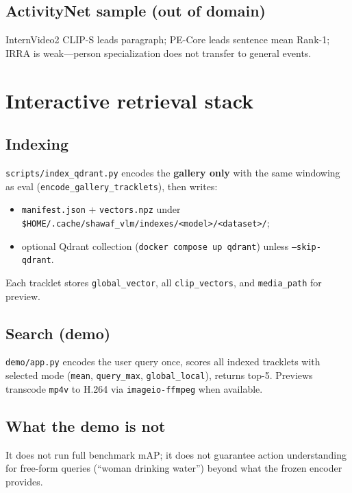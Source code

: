 \documentclass[11pt,a4paper]{article}
\begin{document}
\subsection{ActivityNet sample (out of domain)}
InternVideo2 CLIP-S leads paragraph; PE-Core leads sentence mean Rank-1; IRRA is weak---person specialization does not transfer to general events.

\section{Interactive retrieval stack}

\subsection{Indexing}
\texttt{scripts/index\_qdrant.py} encodes the \textbf{gallery only} with the same windowing as eval (\texttt{encode\_gallery\_tracklets}), then writes:
\begin{itemize}[noitemsep]
  \item \texttt{manifest.json} + \texttt{vectors.npz} under \texttt{\$HOME/.cache/shawaf\_vlm/indexes/<model>/<dataset>/};
  \item optional Qdrant collection (\texttt{docker compose up qdrant}) unless \texttt{--skip-qdrant}.
\end{itemize}
Each tracklet stores \texttt{global\_vector}, all \texttt{clip\_vectors}, and \texttt{media\_path} for preview.

\subsection{Search (demo)}
\texttt{demo/app.py} encodes the user query once, scores all indexed tracklets with selected mode (\texttt{mean}, \texttt{query\_max}, \texttt{global\_local}), returns top-5.
Previews transcode \texttt{mp4v} to H.264 via \texttt{imageio-ffmpeg} when available.

\subsection{What the demo is not}
It does not run full benchmark mAP; it does not guarantee action understanding for free-form queries (``woman drinking water'') beyond what the frozen encoder provides.

\end{document}
